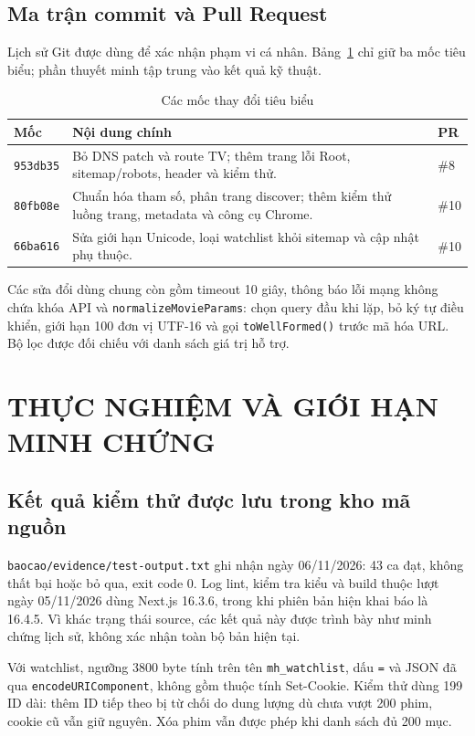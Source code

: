 \documentclass[12pt,a4paper]{extarticle}
\begin{document}
\subsection{Ma trận commit và Pull Request}
Lịch sử Git được dùng để xác nhận phạm vi cá nhân. Bảng~\ref{tab:git-matrix} chỉ giữ ba mốc tiêu biểu; phần thuyết minh tập trung vào kết quả kỹ thuật.
\begin{table}[H]
\centering
\caption{Các mốc thay đổi tiêu biểu}
\label{tab:git-matrix}
\fontsize{9.5}{12.5}\selectfont
\renewcommand{\arraystretch}{1.1}
\begin{tabularx}{\textwidth}{|p{1.8cm}|X|p{0.8cm}|}
\hline
\textbf{Mốc} & \textbf{Nội dung chính} & \textbf{PR} \\
\hline
\texttt{953db35} & Bỏ DNS patch và route TV; thêm trang lỗi Root, sitemap/robots, header và kiểm thử. & \#8 \\
\hline
\texttt{80fb08e} & Chuẩn hóa tham số, phân trang discover; thêm kiểm thử luồng trang, metadata và công cụ Chrome. & \#10 \\
\hline
\texttt{66ba616} & Sửa giới hạn Unicode, loại watchlist khỏi sitemap và cập nhật phụ thuộc. & \#10 \\
\hline
\end{tabularx}
\end{table}
Các sửa đổi dùng chung còn gồm timeout 10 giây, thông báo lỗi mạng không chứa khóa API và \texttt{normalizeMovieParams}: chọn query đầu khi lặp, bỏ ký tự điều khiển, giới hạn 100 đơn vị UTF-16 và gọi \texttt{toWellFormed()} trước mã hóa URL. Bộ lọc được đối chiếu với danh sách giá trị hỗ trợ.

\clearpage
\section{THỰC NGHIỆM VÀ GIỚI HẠN MINH CHỨNG}
\subsection{Kết quả kiểm thử được lưu trong kho mã nguồn}
\nolinkurl{baocao/evidence/test-output.txt} ghi nhận ngày 06/11/2026: 43 ca đạt, không thất bại hoặc bỏ qua, exit code 0. Log lint, kiểm tra kiểu và build thuộc lượt ngày 05/11/2026 dùng Next.js 16.3.6, trong khi phiên bản hiện khai báo là 16.4.5. Vì khác trạng thái source, các kết quả này được trình bày như minh chứng lịch sử, không xác nhận toàn bộ bản hiện tại.

Với watchlist, ngưỡng 3800 byte tính trên tên \texttt{mh\_watchlist}, dấu \texttt{=} và JSON đã qua \texttt{encodeURIComponent}, không gồm thuộc tính Set-Cookie. Kiểm thử dùng 199 ID dài: thêm ID tiếp theo bị từ chối do dung lượng dù chưa vượt 200 phim, cookie cũ vẫn giữ nguyên. Xóa phim vẫn được phép khi danh sách đủ 200 mục.
\end{document}
